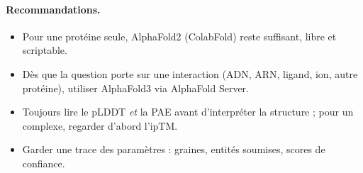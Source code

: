 \paragraph{Recommandations.}
\begin{itemize}
  \item Pour une protéine seule, AlphaFold2 (ColabFold) reste suffisant, libre et scriptable.
  \item Dès que la question porte sur une interaction (ADN, ARN, ligand, ion, autre protéine), utiliser AlphaFold3 via AlphaFold Server.
  \item Toujours lire le pLDDT \emph{et} la PAE avant d'interpréter la structure ; pour un complexe, regarder d'abord l'ipTM.
  \item Garder une trace des paramètres : graines, entités soumises, scores de confiance.
\end{itemize}
